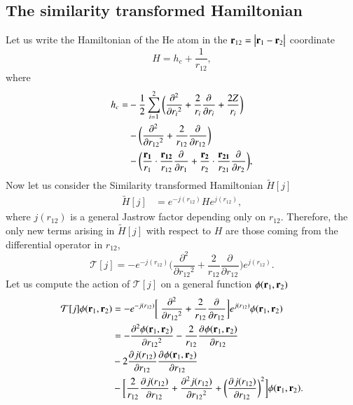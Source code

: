 \documentclass[aip,jcp,reprint,noshowkeys,superscriptaddress]{revtex4-1}
\newcommand{\deriv}[3]{\frac{\partial^{#3} #1}{\partial {#2}^{#3}}}
\newcommand{\bd}[1]{{\bf {#1}}}
\newcommand{\br}[0]{{\bf {r}}}
\begin{document}
\subsection{The similarity transformed Hamiltonian}
Let us write the Hamiltonian of the He atom in the ${\bf r}_{12} = \big|{\bf r}_1 - {\bf r}_2 \big|$ coordinate 
\begin{equation}
 H  = h_c + \frac{1}{r_{12}},
\end{equation}
where 
\begin{equation}
 \begin{aligned}
 \label{def:h_c}
 h_c = &-\frac{1}{2} \sum_{i=1}^2 \bigg(\deriv{}{r_i}{2} + \frac{2}{r_i} \deriv{}{r_i}{} + \frac{2 Z}{r_i}\bigg) \\
     &-\bigg( \deriv{}{r_{12}}{2} + \frac{2}{r_{12}} \deriv{}{r_{12}}{} \bigg) \\
     &-\bigg( \frac{\bd{r_1}}{r_1} \cdot \frac{\bd{r_{12}} }{r_{12}}  \deriv{}{r_1}{} + 
                \frac{\bd{r_2}}{r_2} \cdot \frac{\bd{r_{21}} }{r_{21}}  \deriv{}{r_2}{} \bigg),
 \end{aligned}
\end{equation}
\label{sec:he_j}
Now let us consider the Similarity transformed Hamiltonian $\tilde{H}[j]$
\begin{equation}
 \label{eq:ht_0}
 \begin{aligned}
 \tilde{H}[j]&= e^{-j(r_{12})} H e^{j(r_{12})},
 \end{aligned}
\end{equation}
where $j(r_{12})$ is a general Jastrow factor depending only on $r_{12}$. 
Therefore, the only new terms arising in $\tilde{H}[j]$ with respect to $H$ are those coming from the differential operator in $r_{12}$,
\begin{equation}
 \mathcal{T}[j] =  -e^{-j(r_{12})}\bigg( \deriv{}{r_{12}}{2} + \frac{2}{r_{12}} \deriv{}{r_{12}}{} \bigg)e^{j(r_{12})}.  
\end{equation}
Let us compute the action of $\mathcal{T}[j]$ on a general function $\phi(\br{}_1,\br{}_2)$ 
\begin{equation}
 \begin{aligned}
 \mathcal{T}[j]\phi(\br{}_1,\br{}_2) & =- e^{-j(r_{12})} \bigg[ \deriv{}{r_{12}}{2} + \frac{2}{r_{12}} \deriv{}{r_{12}}{}\bigg]  e^{j(r_{12})} \phi(\br{}_1,\br{}_2) \\ 
                            &=  -\deriv{\phi(\br{}_1,\br{}_2)}{r_{12}}{2} - \frac{2}{r_{12}} \deriv{\phi(\br{}_1,\br{}_2)}{r_{12}}{} \\
  &- 2 \deriv{j(r_{12})}{r_{12}}{} \deriv{\phi(\br{}_1,\br{}_2)}{r_{12}}{} \\ 
  &- \bigg[ \frac{2}{r_{12}} \deriv{j(r_{12})}{r_{12}}{}  + \deriv{j(r_{12})}{r_{12}}{2} + \bigg( \deriv{j(r_{12})}{r_{12}}{} \bigg)^2\bigg] \phi(\br{}_1,\br{}_2). 
 \end{aligned}
\end{equation}
\end{document}
